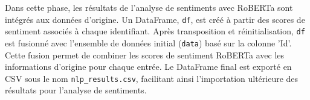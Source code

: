 Dans cette phase, les résultats de l'analyse de sentiments avec RoBERTa sont intégrés aux données d'origine. Un DataFrame, \texttt{df}, est créé à partir des scores de sentiment associés à chaque identifiant. Après transposition et réinitialisation, \texttt{df} est fusionné avec l'ensemble de données initial (\texttt{data}) basé sur la colonne 'Id'. Cette fusion permet de combiner les scores de sentiment RoBERTa avec les informations d'origine pour chaque entrée. Le DataFrame final est exporté en CSV sous le nom \texttt{nlp\_results.csv}, facilitant ainsi l'importation ultérieure des résultats pour l'analyse de sentiments.
